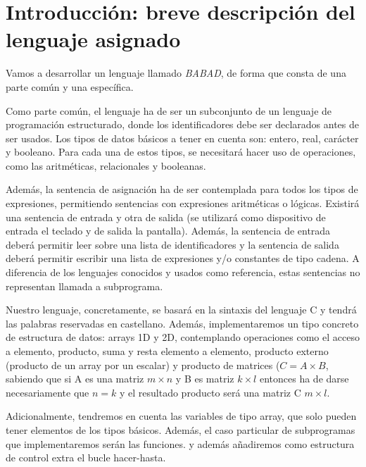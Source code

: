 \section{Introducción: breve descripción del lenguaje asignado}

Vamos a desarrollar un lenguaje llamado \textit{BABAD}, de forma que consta de una parte común y una específica.

Como parte común, el lenguaje ha de ser un subconjunto de un lenguaje de programación estructurado, donde los identificadores debe ser declarados antes de ser usados. Los tipos de datos básicos a tener en cuenta son: entero, real, carácter y booleano. Para cada una de estos tipos, se necesitará hacer uso de operaciones, como las aritméticas, relacionales y booleanas.

Además, la sentencia de asignación ha de ser contemplada para todos los tipos de expresiones, permitiendo sentencias con expresiones aritméticas o lógicas. Existirá una sentencia de entrada y otra de salida (se utilizará como dispositivo de entrada el teclado y de salida la pantalla). Además, la sentencia de entrada deberá permitir leer sobre una lista de identificadores y la sentencia de salida deberá permitir escribir una lista de expresiones y/o constantes de tipo cadena. A diferencia de los lenguajes conocidos y usados como referencia, estas sentencias no representan llamada a subprograma.

Nuestro lenguaje, concretamente, se basará en la sintaxis del lenguaje C y tendrá las palabras reservadas en castellano. Además, implementaremos un tipo concreto de estructura de datos: arrays 1D y 2D, contemplando operaciones como el acceso a elemento, producto, suma y resta elemento a elemento, producto externo (producto de un array por un escalar) y producto de matrices ($C = A \times B$, sabiendo que si A es una matriz $m \times n$ y B es matriz $k \times l$ entonces ha de darse necesariamente que $n = k$ y el resultado producto será una matriz C $m \times l$.

Adicionalmente, tendremos en cuenta las variables de tipo array, que solo pueden tener elementos de los tipos básicos. Además, el caso particular de subprogramas que implementaremos serán las funciones. y además añadiremos como estructura de control extra el bucle hacer-hasta.
